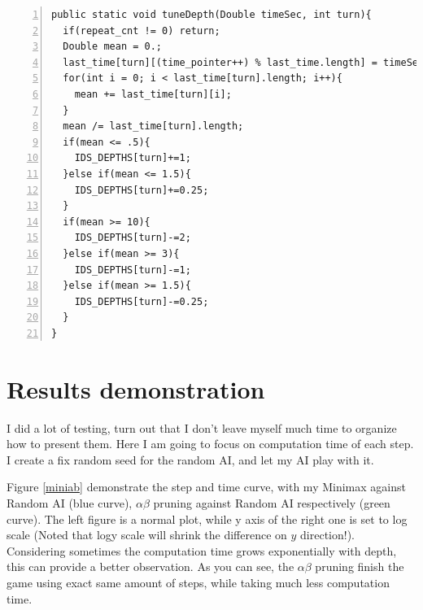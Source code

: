 \documentclass{article}
\begin{document}
\begin{lstlisting}[numbers=left]
public static void tuneDepth(Double timeSec, int turn){
  if(repeat_cnt != 0) return;
  Double mean = 0.;
  last_time[turn][(time_pointer++) % last_time.length] = timeSec;
  for(int i = 0; i < last_time[turn].length; i++){
    mean += last_time[turn][i];
  }
  mean /= last_time[turn].length;
  if(mean <= .5){
    IDS_DEPTHS[turn]+=1;
  }else if(mean <= 1.5){
    IDS_DEPTHS[turn]+=0.25;
  }
  if(mean >= 10){
    IDS_DEPTHS[turn]-=2;
  }else if(mean >= 3){
    IDS_DEPTHS[turn]-=1;
  }else if(mean >= 1.5){
    IDS_DEPTHS[turn]-=0.25;
  }
}
\end{lstlisting}



\clearpage
\section{Results demonstration}


I did a lot of testing, turn out that I don't leave myself much time to organize how to present them. Here I am going to focus on computation time of each step. I create a fix random seed for the random AI, and let my AI play with it. 

Figure \ref{miniab} demonstrate the step and time curve, with my Minimax against Random AI (blue curve),  $\alpha\beta$ pruning against Random AI respectively (green curve). The left figure is a normal plot, while y axis of the right one is set to log scale (Noted that logy scale will shrink the difference on $y$ direction!). Considering sometimes the computation time grows exponentially with depth, this can provide a better observation. As you can see, the $\alpha\beta$ pruning finish the game using exact same amount of steps, while taking much less computation time.
\end{document}
